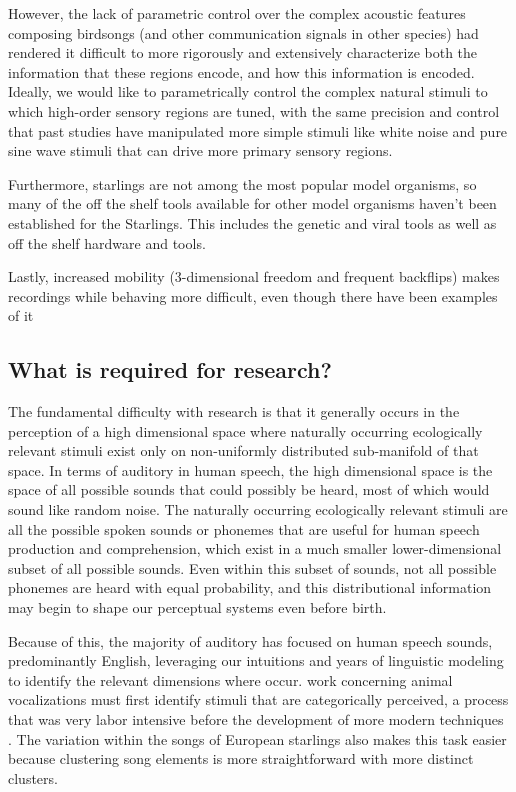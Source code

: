 However, the lack of parametric control over the complex acoustic features composing birdsongs (and other communication signals in other species) had rendered it difficult to more rigorously and extensively characterize both the information that these regions encode, and how this information is encoded.  Ideally, we would like to parametrically control the complex natural stimuli to which high-order sensory regions are tuned, with the same precision and control that past studies have manipulated more simple stimuli like white noise and pure sine wave stimuli that can drive more primary sensory regions.

Furthermore, starlings are not among the most popular model organisms, so many of the off the shelf tools available for other model organisms haven't been established for the Starlings. This includes the genetic and viral tools as well as off the shelf hardware and tools.

Lastly, increased mobility (3-dimensional freedom and frequent backflips) makes recordings while behaving more difficult, even though there have been examples of it \cite{knudsen2013active}

\subsection{What is required for \CP research?}

The fundamental difficulty with \CP research is that it generally occurs in the perception of a high dimensional space where naturally occurring ecologically relevant stimuli exist only on non-uniformly distributed sub-manifold of that space. In terms of auditory \CP in human speech, the high dimensional space is the space of all possible sounds that could possibly be heard, most of which would sound like random noise. The naturally occurring ecologically relevant stimuli are all the possible spoken sounds or phonemes that are useful for human speech production and comprehension, which exist in a much smaller lower-dimensional subset of all possible sounds. Even within this subset of sounds, not all possible phonemes are heard with equal probability, and this distributional information may begin to shape our perceptual systems even before birth.

Because of this, the majority of auditory \CP has focused on human speech sounds, predominantly English, leveraging our intuitions and years of linguistic modeling to identify the relevant dimensions where \CP occur. \CP work concerning animal vocalizations must first identify stimuli that are categorically perceived, a process that was very labor intensive \cite{swamp sparrow series of papers} before the development of more modern techniques \cite{Tim's paper on distribution}. The variation within the songs of European starlings also makes this task easier because clustering song elements is more straightforward with more distinct clusters.

